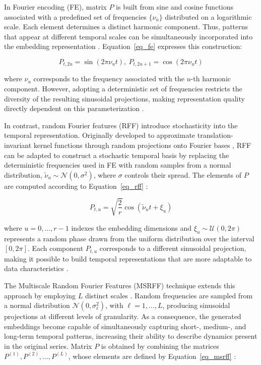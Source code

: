 \documentclass[final,3p,times,twocolumn,authoryear]{elsarticle}
\begin{document}
In Fourier encoding (FE), matrix $P$ is built from sine and cosine functions associated with a predefined set of frequencies $\{\nu_u\}$ distributed on a logarithmic scale. Each element determines a distinct harmonic component. Thus, patterns that appear at different temporal scales can be simultaneously incorporated into the embedding representation \citep{bloomfield_fourier_2018}. Equation~\ref{eq_fe} expresses this construction:

\begin{equation}
\label{eq_fe}
P_{t,2u} = \sin(2\pi \nu_u t), \: P_{t,2u+1} = \cos(2\pi \nu_u t)
\end{equation}

where $\nu_u$ corresponds to the frequency associated with the $u$-th harmonic component. However, adopting a deterministic set of frequencies restricts the diversity of the resulting sinusoidal projections, making representation quality directly dependent on this parameterization \citep{tancik_fourier_2020}.

In contrast, random Fourier features (RFF) introduce stochasticity into the temporal representation. Originally developed to approximate translation-invariant kernel functions through random projections onto Fourier bases \citep{rahimi_random_2007}, RFF can be adapted to construct a stochastic temporal basis by replacing the deterministic frequencies used in FE with random samples from a normal distribution, $\tilde{\nu}_u\sim\mathcal{N}(0,\sigma^2)$, where $\sigma$ controls their spread. The elements of $P$ are computed according to Equation~\ref{eq_rff} \citep{tancik_fourier_2020}:

\begin{equation}
\label{eq_rff}
P_{t,u} = \sqrt{\frac{2}{r}} \cos(\tilde{\nu}_u t+\xi_u)
\end{equation}

where $u = 0, \dots, r - 1$ indexes the embedding dimensions and $\xi_u\sim\mathcal{U}(0, 2\pi)$ represents a random phase drawn from the uniform distribution over the interval $[0, 2\pi]$. Each component $P_{t,u}$ corresponds to a different sinusoidal projection, making it possible to build temporal representations that are more adaptable to data characteristics \citep{rahimi_random_2007, tancik_fourier_2020}.

The Multiscale Random Fourier Features (MSRFF) technique extends this approach by employing $L$ distinct scales \citep{wang_onthe_2021, novelli_fast_2025}. Random frequencies are sampled from a normal distribution $\mathcal{N}(0,\sigma_\ell^2)$, with $\ell = 1, \dots, L$, producing sinusoidal projections at different levels of granularity. As a consequence, the generated embeddings become capable of simultaneously capturing short-, medium-, and long-term temporal patterns, increasing their ability to describe dynamics present in the original series. Matrix $P$ is obtained by combining the matrices $P^{(1)}, P^{(2)}, \dots, P^{(L)}$, whose elements are defined by Equation~\ref{eq_msrff} \citep{wang_onthe_2021}:
\end{document}
